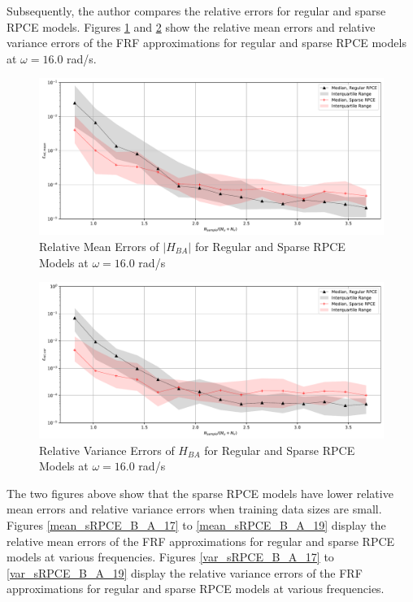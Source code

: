 Subsequently, the author compares the relative errors for regular and sparse RPCE models.
Figures \ref{mean_sRPCE_B_A_16} and \ref{var_sRPCE_B_A_16} show the relative mean errors and relative variance errors of the FRF approximations for regular and sparse RPCE models at $\omega=16.0$ rad/s.
\begin{figure}[H]
    \centering
    \includegraphics[width=1.0\textwidth]{
        plots/surrogate/plot_2_B_16.pdf
    }
    \caption{%
        Relative Mean Errors of $\left|H_{BA}\right|$ for Regular and Sparse RPCE Models at $\omega=16.0$ rad/s
    }
    \label{mean_sRPCE_B_A_16}
\end{figure}
\begin{figure}[H]
    \centering
    \includegraphics[width=1.0\textwidth]{
        plots/surrogate/plot_3_B_16.pdf
    }
    \caption{%
        Relative Variance Errors of $H_{BA}$ for Regular and Sparse RPCE Models at $\omega=16.0$ rad/s
    }
    \label{var_sRPCE_B_A_16}
\end{figure}
The two figures above show that the sparse RPCE models have lower relative mean errors and relative variance errors when training data sizes are small.
Figures \ref{mean_sRPCE_B_A_17} to \ref{mean_sRPCE_B_A_19} display the relative mean errors of the FRF approximations for regular and sparse RPCE models at various frequencies.
Figures \ref{var_sRPCE_B_A_17} to \ref{var_sRPCE_B_A_19} display the relative variance errors of the FRF approximations for regular and sparse RPCE models at various frequencies.
